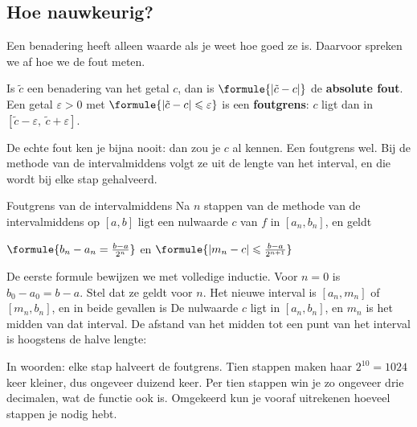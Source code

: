 \subsection{Hoe nauwkeurig?}

Een benadering heeft alleen waarde als je weet hoe goed ze is. Daarvoor spreken we af hoe we de fout meten.

\begin{theorie}
Is $\tilde c$ een benadering van het getal $c$, dan is $\formule{|\tilde c - c|}$ de \textbf{\textcolor{accent}{absolute fout}}. Een getal $\varepsilon > 0$ met $\formule{|\tilde c - c| \leqslant \varepsilon}$ is een \textbf{\textcolor{accent}{foutgrens}}: $c$ ligt dan in $[\tilde c - \varepsilon,\ \tilde c + \varepsilon]$.
\end{theorie}

De echte fout ken je bijna nooit: dan zou je $c$ al kennen. Een foutgrens wel. Bij de methode van de intervalmiddens volgt ze uit de lengte van het interval, en die wordt bij elke stap gehalveerd.

\begin{theorie}
\begin{stelling}{Foutgrens van de intervalmiddens}
Na $n$ stappen van de methode van de intervalmiddens op $[a, b]$ ligt een nulwaarde $c$ van $f$ in $[a_n, b_n]$, en geldt

\vspace{1mm}
\qquad $\formule{b_n - a_n = \frac{b - a}{2^n}}$ \qquad en \qquad $\formule{|m_n - c| \leqslant \frac{b - a}{2^{n+1}}}$
\end{stelling}

\begin{bewijs}
De eerste formule bewijzen we met volledige inductie. Voor $n = 0$ is $b_0 - a_0 = b - a$. Stel dat ze geldt voor $n$. Het nieuwe interval is $[a_n, m_n]$ of $[m_n, b_n]$, en in beide gevallen is
De nulwaarde $c$ ligt in $[a_n, b_n]$, en $m_n$ is het midden van dat interval. De afstand van het midden tot een punt van het interval is hoogstens de halve lengte:
\end{bewijs}
\end{theorie}

In woorden: elke stap halveert de foutgrens. Tien stappen maken haar $2^{10} = 1024$ keer kleiner, dus ongeveer duizend keer. Per tien stappen win je zo ongeveer drie decimalen, wat de functie ook is. Omgekeerd kun je vooraf uitrekenen hoeveel stappen je nodig hebt.


